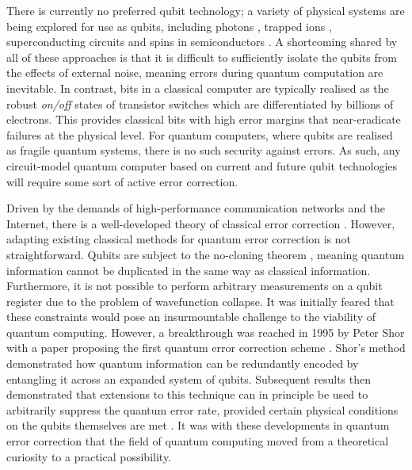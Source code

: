 \documentclass[]{arxiv}
\theoremstyle{plain}%
\theoremstyle{definition}
\theoremstyle{remark}
\begin{document}
There is currently no preferred qubit technology; a variety of physical systems are being explored for use as qubits, including photons \cite{Wang2016,Qiang18}, trapped ions \cite{Randall15,Ballance16,Brandl16,Debnath16}, superconducting circuits \cite{Chow12,Chen2014,Wendin2017} and spins in semiconductors \cite{Kane1998,Hill2015,vanderHeijden18}. A shortcoming shared by all of these approaches is that it is difficult to sufficiently isolate the qubits from the effects of external noise, meaning errors during quantum computation are inevitable. In contrast, bits in a classical computer are typically realised as the robust \textit{on/off} states of transistor switches which are differentiated by billions of electrons. This provides classical bits with high error margins that near-eradicate failures at the physical level. For quantum computers, where qubits are realised as fragile quantum systems, there is no such security against errors. As such, any circuit-model quantum computer based on current and future qubit technologies will require some sort of active error correction.

Driven by the demands of high-performance communication networks and the Internet, there is a well-developed theory of classical error correction \cite{Shannon49,Hamming50,MacKay03a}. However, adapting existing classical methods for quantum error correction is not straightforward. Qubits are subject to the no-cloning theorem \cite{Wootters82}, meaning quantum information cannot be duplicated in the same way as classical information. Furthermore, it is not possible to perform arbitrary measurements on a qubit register due to the problem of wavefunction collapse. It was initially feared that these constraints would pose an insurmountable challenge to the viability of quantum computing. However, a breakthrough was reached in 1995 by Peter Shor with a paper proposing the first quantum error correction scheme \cite{Shor95}. Shor's method demonstrated how quantum information can be redundantly encoded by entangling it across an expanded system of qubits. Subsequent results then demonstrated that extensions to this technique can in principle be used to arbitrarily suppress the quantum error rate, provided certain physical conditions on the qubits themselves are met \cite{Preskill385,Kitaev1997,Aharonov:1997:FQC:258533.258579,Knill1998,Gottesman98}. It was with these developments in quantum error correction that the field of quantum computing moved from a theoretical curiosity to a practical possibility.
\end{document}
